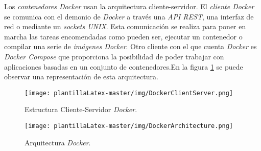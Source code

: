 Los \textit{contenedores Docker} usan la arquitectura cliente-servidor. El \textit{cliente Docker} se comunica con el demonio de \textit{Docker} a través una \textit{API REST}, una interfaz de red o mediante un \textit{sockets UNIX}. Esta comunicación se realiza para poner en marcha las tareas encomendadas como pueden ser, ejecutar un contenedor o compilar una serie de \textit{imágenes Docker}. Otro cliente con el que cuenta \textit{Docker} es \textit{Docker Compose} que proporciona la posibilidad de poder trabajar con aplicaciones basadas en un conjunto de contenedores.En la figura \ref{fig:C-S} se puede observar una representación de esta arquitectura.

\begin{figure}[H]
    \centering
    \texttt{[image: plantillaLatex-master/img/DockerClientServer.png]}
    \caption{Estructura Cliente-Servidor \textit{Docker}.}
    \label{fig:C-S}
\end{figure}

\begin{figure}[H]
    \centering
    \texttt{[image: plantillaLatex-master/img/DockerArchitecture.png]}
    \caption{Arquitectura \textit{Docker}.}
    \label{fig:ArquitecturaD}
\end{figure}


